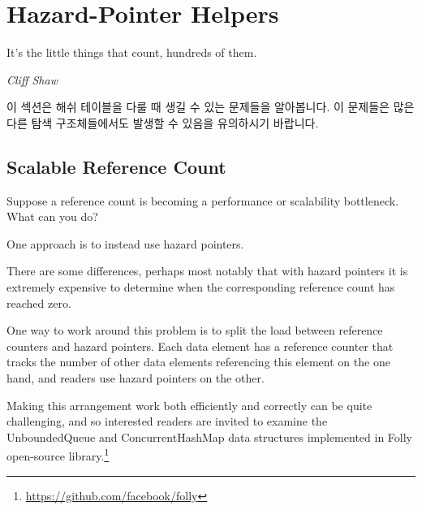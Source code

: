 
\section{Hazard-Pointer Helpers}
\label{sec:together:Hazard-Pointer Helpers}
%
\epigraph{It's the little things that count, hundreds of them.}
	 {\emph{Cliff Shaw}}

이 섹션은 해쉬 테이블을 다룰 때 생길 수 있는 문제들을 알아봅니다.
이 문제들은 많은 다른 탐색 구조체들에서도 발생할 수 있음을 유의하시기 바랍니다.

\iffalse

This section looks at some issues that can arise when dealing with
hash tables.
Please note that these issues also apply to many other search structures.

\fi

\subsection{Scalable Reference Count}
\label{sec:together:Scalable Reference Count}

Suppose a reference count is becoming a performance or scalability
bottleneck.
What can you do?

One approach is to instead use hazard pointers.

There are some differences, perhaps most notably that with
hazard pointers it is extremely expensive to determine when
the corresponding reference count has reached zero.

One way to work around this problem is to split the load between
reference counters and hazard pointers.
Each data element has a reference counter that tracks the number
of other data elements referencing this element on the one hand,
and readers use hazard pointers on the other.

Making this arrangement work both efficiently and correctly can be
quite challenging, and so interested readers are invited to examine
the UnboundedQueue and ConcurrentHashMap data structures implemented in
Folly open-source library.\footnote{
	\url{https://github.com/facebook/folly}}



